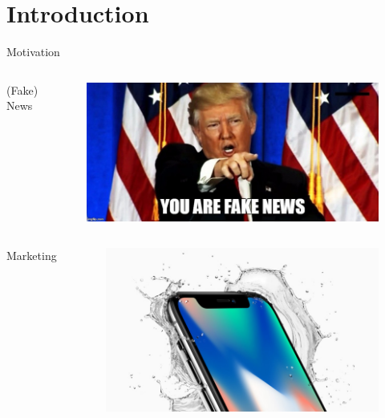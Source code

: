 \documentclass{beamer}
\begin{document}
\section{Introduction}
\begin{frame}{Motivation}
\begin{columns}
(Fake) News
\begin{figure}
    \centering
    \includegraphics[scale = 0.1]{FakeNews.jpg}
\end{figure}
\end{columns}

\begin{columns}
Marketing
\begin{figure}
    \centering
    \includegraphics[scale = 0.1]{Iphone.jpg}
\end{figure}
\end{columns}


\end{frame}
\end{document}
